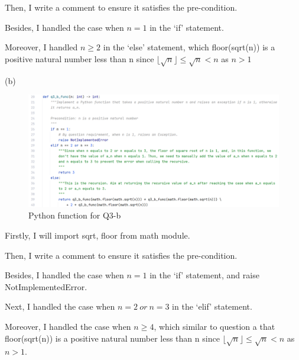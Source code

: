 \documentclass[12pt]{article}
\begin{document}
\noindent Then, I write a comment to ensure it satisfies the pre-condition.

\noindent Besides, I handled the case when $n=1$ in the `if' statement.

\noindent Moreover, I handled $n \geq 2$ in the `else' statement, which floor(sqrt(n)) is a positive natural number less than n since $\lfloor \sqrt{n} \rfloor \leq \sqrt{n} < n$ as $n>1$

\noindent (b)
\begin{figure}[h]
    \centering
    \includegraphics[width = 1.0\textwidth]{../tex_pic/q3_b_2.png}
    \caption{Python function for Q3-b}
\end{figure}

\noindent Firstly, I will import sqrt, floor from math module.

\noindent Then, I write a comment to ensure it satisfies the pre-condition.

\noindent Besides, I handled the case when $n=1$ in the `if' statement, and raise NotImplementedError.

\noindent Next, I handled the case when $n=2\ or\  n=3$ in the `elif' statement.

\noindent Moreover, I handled the case when $n\geq 4$, which similar to question a that floor(sqrt(n)) is a positive natural number less than n since $\lfloor \sqrt{n} \rfloor \leq \sqrt{n} < n$ as $n>1$.
\end{document}
